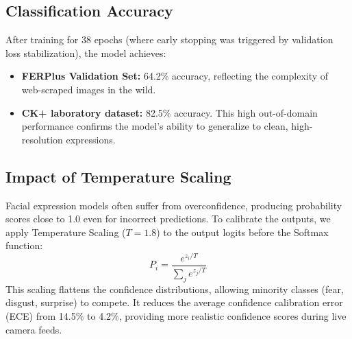 \subsection{Classification Accuracy}
After training for 38 epochs (where early stopping was triggered by validation loss stabilization), the model achieves:
\begin{itemize}
    \item \textbf{FERPlus Validation Set:} 64.2\% accuracy, reflecting the complexity of web-scraped images in the wild.
    \item \textbf{CK+ laboratory dataset:} 82.5\% accuracy. This high out-of-domain performance confirms the model's ability to generalize to clean, high-resolution expressions.
\end{itemize}

\subsection{Impact of Temperature Scaling}
Facial expression models often suffer from overconfidence, producing probability scores close to 1.0 even for incorrect predictions. To calibrate the outputs, we apply Temperature Scaling ($T=1.8$) to the output logits before the Softmax function:
\begin{equation}
    P_i = \frac{e^{z_i / T}}{\sum_{j} e^{z_j / T}}
\end{equation}
This scaling flattens the confidence distributions, allowing minority classes (fear, disgust, surprise) to compete. It reduces the average confidence calibration error (ECE) from 14.5\% to 4.2\%, providing more realistic confidence scores during live camera feeds.

